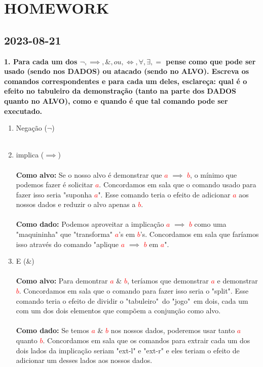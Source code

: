 \documentclass[a4paper, 12pt]{article}
\begin{document}
\section{HOMEWORK}
\subsection{2023-08-21}
\textbf{1. Para cada um dos $ \neg , \implies , \& , ou , \iff , \forall , \exists, =$ pense como que pode ser usado (sendo nos DADOS) ou atacado (sendo no ALVO). Escreva os comandos correspondentes e para cada um deles, esclareça: qual é o efeito no tabuleiro da demonstração (tanto na parte dos DADOS quanto no ALVO), como e quando é que tal comando pode ser executado.}
\begin{enumerate}[($i$)]
    \item Negação ($\neg$) \\ \\
    \item implica ($\implies$) \\ \\
    \textbf{Como alvo:} Se o nosso alvo é demonstrar que \textcolor{red}{$a$} $\implies$ \textcolor{red}{$b$}, o mínimo que podemos fazer é solicitar \textcolor{red}{$a$}. Concordamos em sala que o comando usado para fazer isso seria "suponha \textcolor{red}{$a$}". Esse comando teria o efeito de adicionar \textcolor{red}{$a$} aos nossos dados e reduzir o alvo apenas a \textcolor{red}{$b$}. \\ \\
    \textbf{Como dado:}
    Podemos aproveitar a implicação \textcolor{red}{$a$} $\implies$ \textcolor{red}{$b$} como uma "maquininha" que "transforma" \textcolor{red}{$a$}'s em \textcolor{red}{$b$}'s. Concordamos em sala que faríamos isso através do comando "aplique \textcolor{red}{$a$} $\implies$ \textcolor{red}{$b$} em \textcolor{red}{$a$}".
    \item E ($\&$) \\ \\
    \textbf{Como alvo:} 
    Para demontrar \textcolor{red}{$a$} $\&$ \textcolor{red}{$b$}, teríamos que demonstrar \textcolor{red}{$a$} e demonstrar \textcolor{red}{$b$}. Concordamos em sala que o comando para fazer isso seria o "split". Esse comando teria o efeito de dividir o "tabuleiro"~do "jogo"~em dois, cada um com um dos dois elementos que compõem a conjunção como alvo. \\ \\
    \textbf{Como dado:}
    Se temos \textcolor{red}{$a$} $\&$ \textcolor{red}{$b$} nos nossos dados, poderemos usar tanto \textcolor{red}{$a$} quanto \textcolor{red}{$b$}. Concordamos em sala que os comandos para extrair cada um dos dois lados da implicação seriam "ext-l" e "ext-r" e eles teriam o efeito de adicionar um desses lados aos nossos dados.

\end{enumerate}
\end{document}
